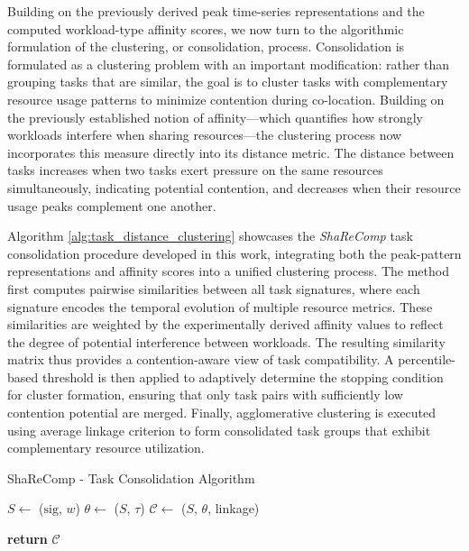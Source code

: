 \label{sec:algorithmic_approach_consolidation}

Building on the previously derived peak time-series representations and the computed workload-type affinity scores, we now turn to the algorithmic formulation of the clustering, or consolidation, process.
Consolidation is formulated as a clustering problem with an important modification: rather than grouping tasks that are similar, the goal is to cluster tasks with complementary resource usage patterns to minimize contention during co-location. Building on the previously established notion of affinity—which quantifies how strongly workloads interfere when sharing resources—the clustering process now incorporates this measure directly into its distance metric. The distance between tasks increases when two tasks exert pressure on the same resources simultaneously, indicating potential contention, and decreases when their resource usage peaks complement one another.

Algorithm \ref{alg:task_distance_clustering} showcases the \textit{ShaReComp} task consolidation procedure developed in this work, integrating both the peak-pattern representations and affinity scores into a unified clustering process. The method first computes pairwise similarities between all task signatures, where each signature encodes the temporal evolution of multiple resource metrics. These similarities are weighted by the experimentally derived affinity values to reflect the degree of potential interference between workloads. The resulting similarity matrix thus provides a contention-aware view of task compatibility.
A percentile-based threshold is then applied to adaptively determine the stopping condition for cluster formation, ensuring that only task pairs with sufficiently low contention potential are merged. Finally, agglomerative clustering is executed using average linkage criterion to form consolidated task groups that exhibit complementary resource utilization.

\begin{algorithm}[H]
    \caption{ShaReComp - Task Consolidation Algorithm}
    \label{alg:task_distance_clustering}


    $S \gets$ \Sim($\mathrm{sig}$, $w$) 
    $\theta \gets$ \Thresh($S$, $\tau$) 
    $\mathcal{C} \gets$ \Merge($S$, $\theta$, linkage) 

    \textbf{return } $\mathcal{C}$
\end{algorithm}

